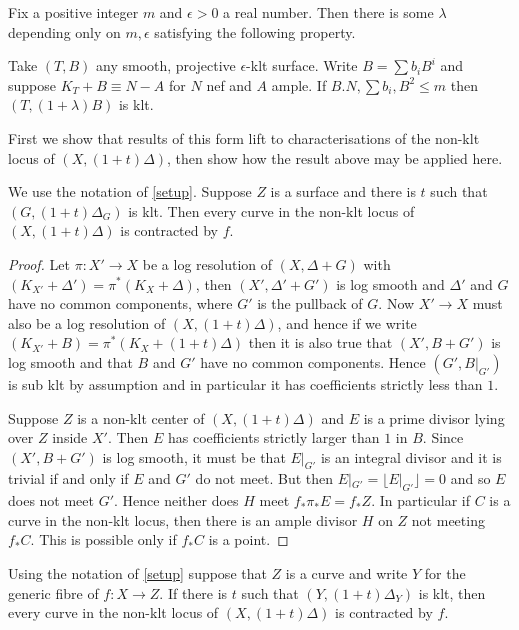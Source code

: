 \begin{theorem}\label{Jiang}\cite[Theorem 5.1]{jiang2018birational}
	Fix a positive integer $m$ and $\epsilon >0$ a real number. Then there is some $\lambda$ depending only on $m,\epsilon$ satisfying the following property.
	
	Take $(T,B)$ any smooth, projective $\epsilon$-klt surface. Write $B=\sum b_{i}B^{i}$ and suppose $K_{T}+B \equiv N-A$ for $N$ nef and $A$ ample. If $B.N,\sum b_{i}, B^{2} \leq m$ then $(T,(1+\lambda)B)$ is klt. 
\end{theorem}
First we show that results of this form lift to characterisations of the non-klt locus of $(X,(1+t)\Delta)$, then show how the result above may be applied here.
\begin{lemma}
	We use the notation of \autoref{setup}. Suppose $Z$ is a surface and there is $t$ such that $(G,(1+t)\Delta_{G})$ is klt. Then every curve in the non-klt locus of $(X,(1+t)\Delta)$ is contracted by $f$.
\end{lemma}
\begin{proof}
	Let $\pi\colon X' \to X$ be a log resolution of $(X,\Delta+G)$ with $(K_{X'}+\Delta')=\pi^{*}(K_{X}+\Delta)$, then $(X',\Delta'+G')$ is log smooth and $\Delta'$ and $G$ have no common components, where $G'$ is the pullback of $G$. Now $X' \to X$ must also be a log resolution of $(X,(1+t)\Delta)$, and hence if we write $(K_{X'}+B)=\pi^{*}(K_{X}+(1+t)\Delta)$ then it is also true that $(X',B+G')$ is log smooth and that $B$ and $G'$ have no common components. Hence $(G',B|_{G'})$ is sub klt by assumption and in particular it has coefficients strictly less than $1$. 
	
	Suppose $Z$ is a non-klt center of $(X,(1+t)\Delta)$ and $E$ is a prime divisor lying over $Z$ inside $X'$. Then $E$ has coefficients strictly larger than $1$ in $B$. Since $(X',B+G')$ is log smooth, it must be that $E|_{G'}$ is an integral divisor and it is trivial if and only if $E$ and $G'$ do not meet. But then $E|_{G'} =\lfloor E|_{G'} \rfloor =0$ and so $E$ does not meet $G'$. Hence neither does $H$ meet $f_{*}\pi_{*}E=f_{*}Z$. In particular if $C$ is a curve in the non-klt locus, then there is an ample divisor $H$ on $Z$ not meeting $f_{*}C$. This is possible only if $f_{*}C$ is a point. 
\end{proof}


\begin{lemma}
	Using the notation of \autoref{setup} suppose that $Z$ is a curve and write $Y$ for the generic fibre of $f\colon X\to Z$. If there is $t$ such that $(Y,(1+t)\Delta_{Y})$ is klt, then every curve in the non-klt locus of $(X,(1+t)\Delta)$ is contracted by $f$.
\end{lemma}

